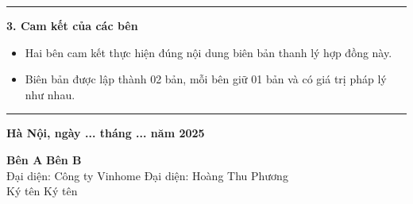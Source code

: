 {\begin{minipage}{\textwidth}
        \noindent\rule{\textwidth}{0.4pt}

        \noindent\textbf{3. Cam kết của các bên}
        \begin{itemize}
            \item Hai bên cam kết thực hiện đúng nội dung biên bản thanh lý hợp đồng này.
            \item Biên bản được lập thành 02 bản, mỗi bên giữ 01 bản và có giá trị pháp lý như nhau.
        \end{itemize}
        \noindent\rule{\textwidth}{0.4pt}
        \begin{flushright}
            \textbf{Hà Nội, ngày ... tháng ... năm 2025} \\ \vspace{0.5cm}
        \end{flushright}
        \begin{flushleft}
            \hspace{2cm} \textbf{Bên A} \hspace{8cm} \textbf{Bên B}\\
            \hspace{1cm} Đại diện: Công ty Vinhome \hspace{3.5cm} Đại diện: Hoàng Thu Phương\\
            \hspace{2cm} Ký tên          \hspace{8cm} Ký tên\\ \vspace{1cm}
        \end{flushleft}
	\end{minipage}
}
